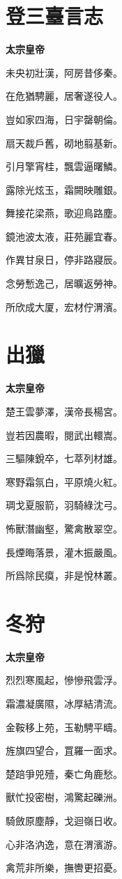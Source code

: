 \documentclass[12pt,a4paper]{ctexbook}
\begin{document}
\section{登三臺言志}
\textbf{太宗皇帝}\par\vspace{0.5em}
未央初壯漢，阿房昔侈秦。\par
在危猶騁麗，居奢遂役人。\par
豈如家四海，日宇罄朝倫。\par
扇天裁戶舊，砌地翦基新。\par
引月擎宵桂，飄雲逼曙鱗。\par
露除光炫玉，霜闕映雕銀。\par
舞接花梁燕，歌迎鳥路塵。\par
鏡池波太液，莊苑麗宜春。\par
作異甘泉日，停非路寢辰。\par
念勞慙逸己，居曠返勞神。\par
所欣成大厦，宏材佇渭濱。\par

\section{出獵}
\textbf{太宗皇帝}\par\vspace{0.5em}
楚王雲夢澤，漢帝長楊宮。\par
豈若因農暇，閱武出轘嵩。\par
三驅陳銳卒，七萃列材雄。\par
寒野霜氛白，平原燒火紅。\par
琱戈夏服箭，羽騎綠沈弓。\par
怖獸潛幽壑，驚禽散翠空。\par
長煙晦落景，灌木振嚴風。\par
所爲除民瘼，非是悅林叢。\par

\section{冬狩}
\textbf{太宗皇帝}\par\vspace{0.5em}
烈烈寒風起，慘慘飛雲浮。\par
霜濃凝廣隰，冰厚結清流。\par
金鞍移上苑，玉勒騁平疇。\par
旌旗四望合，罝羅一面求。\par
楚踣爭兕殪，秦亡角鹿愁。\par
獸忙投密樹，鴻驚起礫洲。\par
騎斂原塵靜，戈迴嶺日收。\par
心非洛汭逸，意在渭濱游。\par
禽荒非所樂，撫轡更招憂。\par
\end{document}
